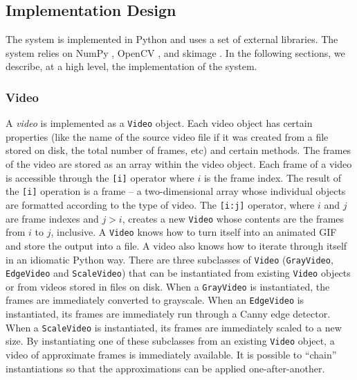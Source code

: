 \subsection{Implementation Design}
\label{sec:ImplementationDesign}
The system is implemented in Python and uses a set of external libraries. The system relies on NumPy \cite{NumPy}, OpenCV \cite{OpenCV}, and skimage \cite{skimage}. In the following sections, we describe, at a high level, the implementation of the system.
\subsubsection{Video}
\label{sec:Video}
A \textit{video} is implemented as a \texttt{Video} object. Each video object has certain properties (like the name of the source video file if it was created from a file stored on disk, the total number of frames, etc) and certain methods. 
The frames of the video are stored as an array within the video object. Each frame of a video is accessible through the \texttt{[i]} operator where $i$ is the frame index. The result of the \texttt{[i]} operation is a frame -- a two-dimensional array whose individual objects are formatted according to the type of video. The \texttt{[i:j]} operator, where $i$ and $j$ are frame indexes and $j>i$, creates a new \texttt{Video} whose contents are the frames from $i$ to $j$, inclusive. 
A \texttt{Video} knows how to turn itself into an animated GIF and store the output into a file. A video also knows how to iterate through itself in an idiomatic Python way. 
There are three subclasses of \texttt{Video} (\texttt{GrayVideo}, \texttt{EdgeVideo} and \texttt{ScaleVideo}) that can be instantiated from existing \texttt{Video} objects or from videos stored in files on disk. When a \texttt{GrayVideo} is instantiated, the frames are immediately converted to grayscale. When an \texttt{EdgeVideo} is instantiated, its frames are immediately run through a Canny edge detector. When a \texttt{ScaleVideo} is instantiated, its frames are immediately scaled to a new size. By instantiating one of these subclasses from an existing \texttt{Video} object, a video of approximate frames is immediately available. It is possible to ``chain'' instantiations so that the approximations can be applied one-after-another. 

